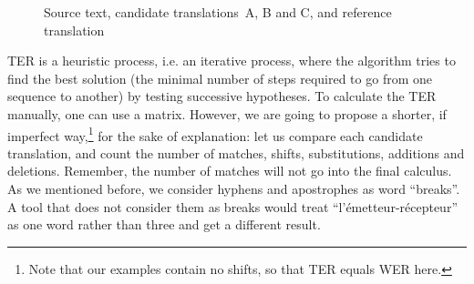\documentclass[output=paper]{langscibook}
\begin{document}
\begin{figure}
\small
{}
\caption{Source text, candidate translations~A, B and C, and reference translation}
\label{fig:rossi:7b}
\end{figure}

TER is a heuristic process, i.e. an iterative process, where the algorithm tries to find the best solution (the minimal number of steps required to go from one sequence to another) by testing successive hypotheses. To calculate the TER manually, one can use a matrix. However, we are going to propose a shorter, if imperfect way,\footnote{Note that our examples contain no shifts, so that TER equals WER here.} for the sake of explanation: let us compare each candidate translation, and count the number of matches, shifts, substitutions, additions and deletions. Remember, the number of matches will not go into the final calculus. As we mentioned before, we consider hyphens and apostrophes as word “breaks”. A tool that does not consider them as breaks would treat “l’émetteur-récepteur” as one word rather than three and get a different result.


\begin{table}[H]
\caption{Operations needed to transform candidate A into reference.\label{tab:rossi:5}}
\end{table}
\end{document}
